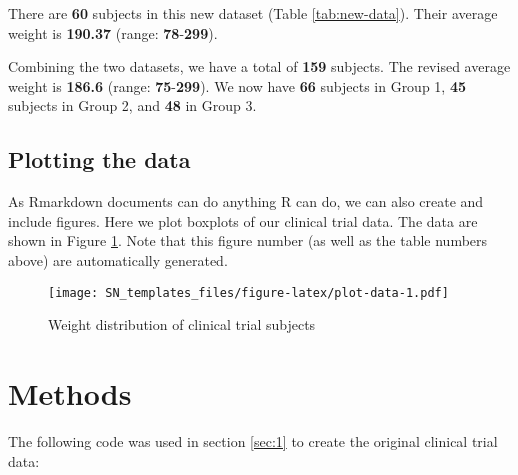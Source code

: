 \documentclass[smallextended]{svjour3}       %
\begin{document}
There are \textbf{60} subjects in this new dataset (Table \ref{tab:new-data}). Their average weight is \textbf{190.37} (range: \textbf{78}-\textbf{299}).

Combining the two datasets, we have a total of \textbf{159} subjects. The revised average weight is \textbf{186.6} (range: \textbf{75}-\textbf{299}). We now have \textbf{66} subjects in Group 1, \textbf{45} subjects in Group 2, and \textbf{48} in Group 3.

\hypertarget{sec:2}{%
\subsection{Plotting the data}\label{sec:2}}

As Rmarkdown documents can do anything R can do, we can also create and include figures. Here we plot boxplots of our clinical trial data. The data are shown in Figure \ref{fig:plot-data}. Note that this figure number (as well as the table numbers above) are automatically generated.

\begin{figure}
\centering
\texttt{[image: SN\_templates\_files/figure-latex/plot-data-1.pdf]}
\caption{\label{fig:plot-data}Weight distribution of clinical trial subjects}
\end{figure}

\hypertarget{methods}{%
\section{Methods}\label{methods}}

The following code was used in section \ref{sec:1} to create the original clinical trial data:
\end{document}
